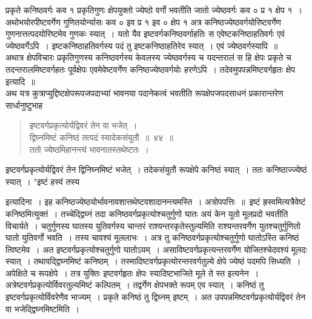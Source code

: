 \documentclass[11pt, openany]{book}
\begin{document}
\vspace{-3mm}
 प्रकृते कनिष्ठवर्गः कव १ प्रकृतिगुणः क्षेपयुक्तो ज्येष्ठो वर्गो 
भवतीति जातो ज्येष्ठवर्गः कव ० प्र १ क्षेप १~। अथोभयोरपीष्टवर्गेण 
गुणितयोर्न्यासः कव ० इव प्र १ इव ० क्षेप १ अत्र कनिष्ठज्येष्ठवर्गयोरिष्टवर्गेण गुणनात्तत्पदयोरिष्टमेव गुणकः स्यात्~। यतो यैव इष्टवर्गकनिष्ठवर्गाहतिः स एवेष्टकनिष्ठाहतिवर्गः एवं ज्येष्ठवर्गेऽपि~।
इष्टकनिष्ठाहतिवर्गस्य पदं तु इष्टकनिष्ठाहतिरेव स्यात्~। एवं ज्येष्ठवर्गस्यापि~॥~\\

\vspace{-3mm}
 अथात्र क्षेपविचारः प्रकृतिगुणस्य कनिष्ठवर्गस्य केवलस्य ज्येष्ठवर्गस्य
च यदन्तरालं स हि क्षेपः प्रकृते च तदन्तरालमिष्टवर्गहतः पूर्वक्षेपः 
एवमेवेष्टवर्गेण कनिष्ठज्येष्ठवर्गयोः हरणेऽपि~। तदेवमुपपन्नमिष्टवर्गहृतः क्षेप इत्यादि~॥\\

\vspace{-3mm}
 अथ यत्र कुत्राप्युद्दिष्टक्षेपरूपजपदाभ्यां भावनया पदानेकत्वं भवतीति 
रूपक्षेपजपदसाधनं प्रकारान्तरेण सार्धानुष्टुभाह\textendash
\begin{quote}
    \bs
  इष्टवर्गप्रकृत्योर्यद्विवरं तेन वा भजेत्~। \\
 द्विघ्नमिष्टं कनिष्ठं तत्पदं स्यादेकसंयुतौ~॥~४४~॥~\\

\vspace{-5mm}
 ततो ज्येष्ठमिहानन्त्यं भावनातस्तथेष्टतः~। 
 \end{quote}

 इष्टवर्गप्रकृत्योर्यद्विवरं तेन द्विनिघ्नमिष्टं भजेत्~। तदेकसंयुतौ 
रूपक्षेपे कनिष्ठं स्यात्~। ततः कनिष्ठाज्ज्येष्ठं स्यात्~। {\qt "इष्टं हस्वं तस्य}
 \newpage

 इत्यादिना~। इह
कनिष्ठज्येष्ठयोर्भावनावशात्तथेष्टवशादानन्त्यमस्ति~। अत्रोपपत्तिः~॥~इष्टं ह्रस्वमित्यत्रैवेष्टं
कनिष्ठमित्युक्तं~। तच्चेद्द्विघ्नं तदा कनिष्ठवर्गप्रकृत्योश्चतुर्गुणो घातः अयं केन युतो
मूलप्रदो भवतीति विचार्यते~। चतुर्गुणस्य घातस्य युतिवर्गस्य चान्तरं राश्यन्तरकृतेस्तुल्यमिति राश्यन्तरवर्गेण युतश्चतुर्गुणितो घातो युतिवर्गो भवति~।
तस्य चावश्यं मूललाभः~। अत्र तु कनिष्ठवर्गप्रकृत्योश्चतुर्गुणो घातोऽस्ति
कनिष्ठं त्विष्टमेव~। अत इष्टवर्गप्रकृत्योश्चतुर्गुणो घातोऽयम्~। असाविष्टवर्गप्रकृत्यन्तरवर्गेण योजितश्चेदवश्यं मूलदः स्यात्~। तथावद्द्विघ्नमिष्टं कनिष्ठम्~। तस्मादिष्टवर्गप्रकृत्योरन्तरवर्गतुल्ये क्षेपे ज्येष्ठं पदमपि सिध्यति~। अपेक्षिते च रूपक्षेपे~। तत्र युक्तिः इष्टवर्गहृतः क्षेपः स्यादिष्टभाजिते मूले ते स्त इत्यनेन~। अत्रेष्टवर्गप्रकृत्योर्विवरतुल्यमिष्टं कल्पितम्~। तद्वर्गेण क्षेपभक्ते रूपम् एव स्यात्~। कनिष्ठं तु इष्टवर्गप्रकृत्योर्विवरेणैव भाज्यम्~। प्रकृते कनिष्ठं तु द्विघ्नम् इष्टम्~। अत
उपपन्नमिष्टवर्गप्रकृत्योर्यद्विवरं तेन वा भजेद्द्विघ्नमिष्टमिति~। \\
\end{document}
